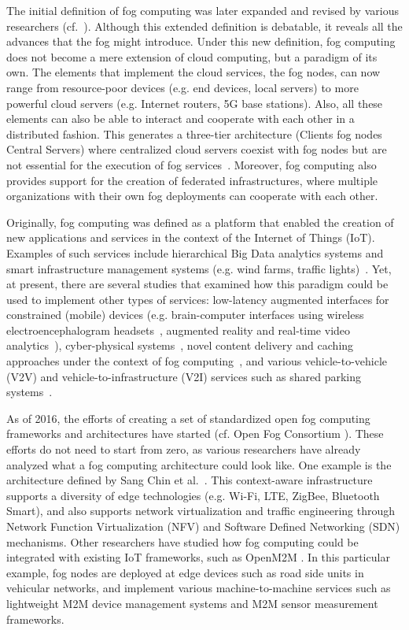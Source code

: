 \documentclass[twocolumn,preprint,3p]{elsarticle}
\begin{document}
The initial definition of fog computing was later expanded and revised by various researchers (cf.~\cite{Vaquero14,Yi15}). Although this extended definition is debatable, it reveals all the advances that the fog might introduce. Under this new definition, fog computing does not become a mere extension of cloud computing, but a paradigm of its own. The elements that implement the cloud services, the fog nodes, can now range from resource-poor devices (e.g. end devices, local servers) to more powerful cloud servers (e.g. Internet routers, 5G base stations). Also, all these elements can also be able to interact and cooperate with each other in a distributed fashion. This generates a three-tier architecture (Clients  fog nodes  Central Servers) where centralized cloud servers coexist with fog nodes but are not essential for the execution of fog services~\cite{Luan15}. Moreover, fog computing also provides support for the creation of federated infrastructures, where multiple organizations with their own fog deployments can cooperate with each other.

Originally, fog computing was defined as a platform that enabled the creation of new applications and services in the context of the Internet of Things (IoT). Examples of such services include hierarchical Big Data analytics systems and smart infrastructure management systems (e.g. wind farms, traffic lights)~\cite{Bonomi12,Vaquero14}. Yet, at present, there are several studies that examined how this paradigm could be used to implement other types of services: low-latency augmented interfaces for constrained (mobile) devices (e.g. brain-computer interfaces using wireless electroencephalogram headsets~\cite{Zao14}, augmented reality and real-time video analytics~\cite{Ha14}), cyber-physical systems~\cite{StojmenovicCG14}, novel content delivery and caching approaches under the context of fog computing~\cite{Jingtao15}, and various vehicle-to-vehicle (V2V) and vehicle-to-infrastructure (V2I) services such as shared parking systems~\cite{Kim15}.

As of 2016, the efforts of creating a set of standardized open fog computing frameworks and architectures have started (cf. Open Fog Consortium \cite{OpenFog15}). These efforts do not need to start from zero, as various researchers have already analyzed what a fog computing architecture could look like. One example is the architecture defined by Sang Chin et al.~\cite{Chin15}. This context-aware infrastructure supports a diversity of edge technologies (e.g. Wi-Fi, LTE, ZigBee, Bluetooth Smart), and also supports network virtualization and traffic engineering through Network Function Virtualization (NFV) and Software Defined Networking (SDN) mechanisms. Other researchers have studied how fog computing could be integrated with existing IoT frameworks, such as OpenM2M \cite{Datta15}. In this particular example, fog nodes are deployed at edge devices such as road side units in vehicular networks, and implement various machine-to-machine services such as lightweight M2M device management systems and M2M sensor measurement frameworks.
\end{document}
